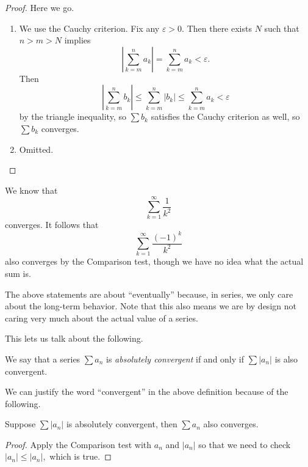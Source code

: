 \documentclass[../notes.tex]{subfiles}
\begin{document}
\begin{proof}
	Here we go.
	\begin{enumerate}[label=(\alph*)]
		\item We use the Cauchy criterion. Fix any $\varepsilon>0.$ Then there exists $N$ such that $n>m>N$ implies
		\[\left|\sum_{k=m}^na_k\right|=\sum_{k=m}^na_k<\varepsilon.\]
		Then
		\[\left|\sum_{k=m}^nb_k\right|\le\sum_{k=m}^n|b_k|\le\sum_{k=m}^na_k<\varepsilon\]
		by the triangle inequality, so $\sum b_k$ satisfies the Cauchy criterion as well, so $\sum b_k$ converges.
		\item Omitted.
		\qedhere
	\end{enumerate}
\end{proof}
\begin{example}
	We know that
	\[\sum_{k=1}^\infty\frac1{k^2}\]
	converges. It follows that
	\[\sum_{k=1}^\infty\frac{(-1)^k}{k^2}\]
	also converges by the Comparison test, though we have no idea what the actual sum is.
\end{example}
\begin{warn}
	The above statements are about ``eventually'' because, in series, we only care about the long-term behavior. Note that this also means we are by design not caring very much about the actual value of a series.
\end{warn}

This lets us talk about the following.
\begin{definition}
	We say that a series $\sum a_n$ is \textit{absolutely convergent} if and only if $\sum|a_n|$ is also convergent.
\end{definition}
We can justify the word ``convergent'' in the above definition because of the following.
\begin{prop}
	Suppose $\sum|a_n|$ is absolutely convergent, then $\sum a_n$ also converges.
\end{prop}
\begin{proof}
	Apply the Comparison test with $a_n$ and $|a_n|$ so that we need to check $|a_n|\le|a_n|,$ which is true.
\end{proof}
\end{document}

